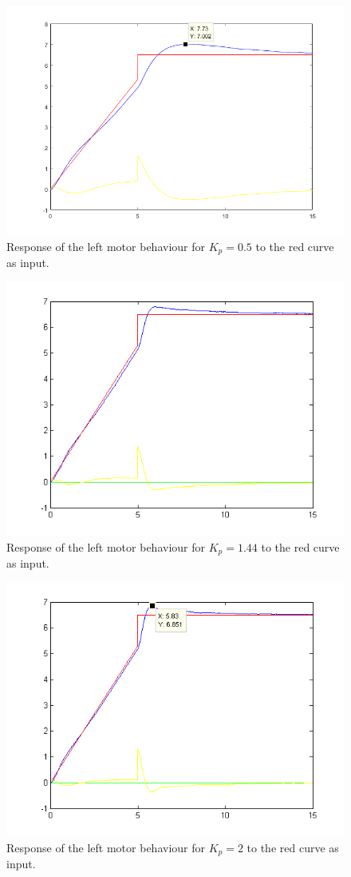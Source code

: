 \begin{figure}[htbp]
\centering
\includegraphics[width = .7\textwidth]{pics/LM_KP050a.png}
\caption{Response of the left motor behaviour for $K_p = 0.5$ to the red curve as input.}
\label{fig:LM_KP050}
\end{figure}

\begin{figure}[htbp]
\centering
\includegraphics[width = .7\textwidth]{pics/LM_KP144.png}
\caption{Response of the left motor behaviour for $K_p = 1.44$ to the red curve as input.}
\label{fig:LM_KP144}
\end{figure}

\begin{figure}[htbp]
\centering
\includegraphics[width = .7\textwidth]{pics/LM_KP200.png}
\caption{Response of the left motor behaviour for $K_p = 2$ to the red curve as input.}
\label{fig:LM_KP200}
\end{figure}

